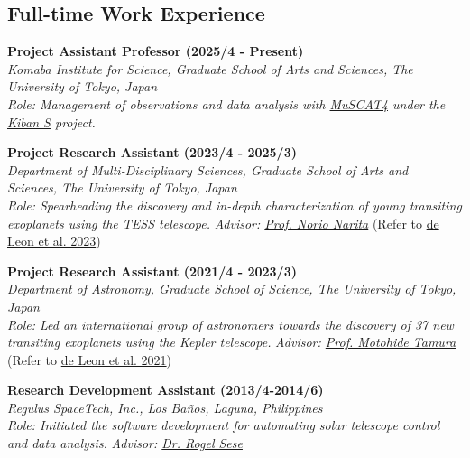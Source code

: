\documentclass[12pt,letterpaper]{article}
\begin{document}
\subsection{Full-time Work Experience}
\begin{list}{}{\cvlist}
    \item
        \textbf{Project Assistant Professor (2025/4 - Present)} \\
        \textit{Komaba Institute for Science, Graduate School of Arts and Sciences, The University of Tokyo, Japan} \\
        \textit{Role: Management of observations and data analysis with \href{muscat4url}{MuSCAT4} under the \href{kibanSurl}{Kiban S} project.}\\
        
    \item
        \textbf{Project Research Assistant (2023/4 - 2025/3)} \\
        \textit{Department of Multi-Disciplinary Sciences, Graduate School of Arts and Sciences, The University of Tokyo, Japan} \\
        \textit{Role: Spearheading the discovery and in-depth characterization of young transiting exoplanets using the TESS telescope.}
        \textit{Advisor: \href{\naritaurl}{Prof. Norio Narita}} (Refer to \href{\paperthree}{de Leon et al. 2023})\\

    \item
        \textbf{Project Research Assistant (2021/4 - 2023/3)} \\
        \textit{Department of Astronomy, Graduate School of Science, The University of Tokyo, Japan} \\
        \textit{Role: Led an international group of astronomers towards the discovery of 37 new transiting exoplanets using the Kepler telescope.}
        \textit{Advisor: \href{tamuraurl}{Prof. Motohide Tamura}} (Refer to \href{\papertwo}{de Leon et al. 2021})\\
        
    \item
        \textbf{Research Development Assistant (2013/4-2014/6)}\\
        \textit{Regulus SpaceTech, Inc., Los Ba\~nos, Laguna, Philippines}\\
        \textit{Role: Initiated the software development for automating solar telescope control and data analysis.}
        \textit{Advisor: \href{\seseurl}{Dr. Rogel Sese}} \\
\end{list}
\end{document}
